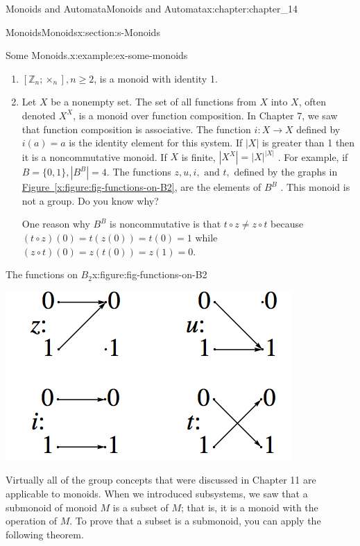 \documentclass[oneside,10pt,]{book}
\newcommand{\xreffont}{\relax}
\numberwithin{equation}{section}
\begin{document}
\begin{chapterptx}{Monoids and Automata}{}{Monoids and Automata}{}{}{x:chapter:chapter_14}
\begin{sectionptx}{Monoids}{}{Monoids}{}{}{x:section:s-Monoids}
\begin{example}{Some Monoids.}{x:example:ex-some-monoids}
\begin{enumerate}[label=(\alph*)]
\item{}\(\left[\mathbb{Z}_n;\times_n\right],n\geqslant 2\), is a monoid with identity 1.%
\item{}Let \(X\) be a nonempty set. The set of all functions from \(X\) into \(X\), often denoted \(X^X\), is a monoid over function composition. In Chapter 7, we saw that function composition is associative. The function \(i:X\to X\) defined by \(i(a)=a\) is the identity element for this system. If \(\lvert X\rvert\) is greater than 1 then it is a noncommutative monoid. If \(X\) is finite, \(\left\lvert X^X\right\rvert =\lvert X\rvert ^{\lvert X\rvert }\) . For example, if \(B=\{0,1\}, \left\lvert B^B\right\rvert=4\). The functions \(z,u,i,\textrm{ and } t,\) defined by the graphs in \hyperref[x:figure:fig-functions-on-B2]{Figure~{\xreffont\ref{x:figure:fig-functions-on-B2}}}, are the elements of \(B^B\) . This monoid is not a group. Do you know why?%
\par
One reason why \(B^B\) is noncommutative is that \(t \circ z \neq z \circ t\) because \((t\circ z)(0)=t(z(0))=t(0)=1\) while \((z\circ t)(0)=z(t(0))=z(1)=0\).%
\end{enumerate}
%
\end{example}
\begin{figureptx}{The functions on \(B_2\)}{x:figure:fig-functions-on-B2}{}%
\begin{image}{0.15}{0.7}{0.15}%
\includegraphics[width=\linewidth]{images/fig-functions-on-B2.png}
\end{image}%
\tcblower
\end{figureptx}%
Virtually all of the group concepts that were discussed in Chapter 11 are applicable to monoids. When we introduced subsystems, we saw that a submonoid of monoid \(M\) is a subset of \(M\); that is, it is a monoid with the operation of \(M\). To prove that a subset is a submonoid, you can apply the following theorem.%

\end{sectionptx}
\end{chapterptx}
\end{document}
